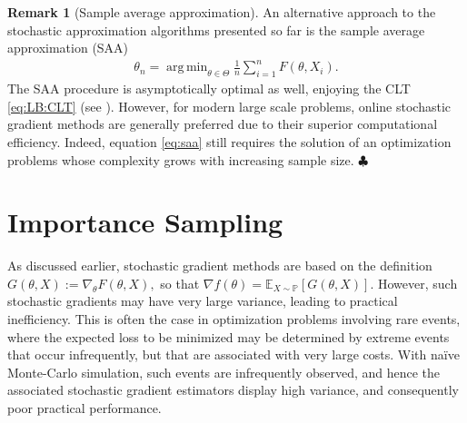 \documentclass[11pt,a4paper]{article}
\theoremstyle{definition}
\newtheorem{remark}[theorem]{Remark}
\DeclareMathOperator*{\argmin}{arg\,min}
\newcommand{\defn}{:=}
\begin{document}
\begin{remark}[Sample average approximation]
\label{remark:SAA}
An alternative approach to the stochastic approximation algorithms presented so far is the sample average approximation (SAA)
\begin{align}
  \label{eq:saa}
    \theta_n = \argmin_{\theta \in \Theta} \frac{1}{n} \sum_{i=1}^n F(\theta,X_i).
\end{align}
The SAA procedure is asymptotically optimal as well, enjoying the CLT \eqref{eq:LB:CLT} (see \cite[Theorem~3.3]{shapiro1989asymptotic}). However, for modern large scale problems, online stochastic gradient methods are generally preferred due to their superior computational efficiency. Indeed, equation \eqref{eq:saa} still requires the solution of an optimization problems whose complexity grows with increasing sample size. \hfill $\clubsuit$
\end{remark}








\section{Importance Sampling}
\label{sec:importance-sampling}

As discussed earlier, stochastic gradient methods are based on the definition 
\(
G(\theta, X) \defn \nabla_{\theta}F(\theta,X),
\)
so that $\nabla f(\theta) = \mathbb E_{X \sim \mathbb P}\left[ G(\theta, X) \right]$.
However, such stochastic gradients may have very large variance, leading to practical inefficiency.
This is often the case in optimization problems involving rare events, where the expected loss to be minimized may be determined by extreme events that occur infrequently, but that are associated with very large costs.
With naïve Monte-Carlo simulation, such events are infrequently observed, and hence the associated stochastic gradient estimators display high variance, and consequently poor practical performance.
\end{document}

